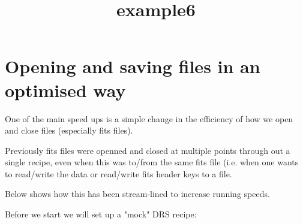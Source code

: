 \documentclass[11pt]{article}
\title{example6}
\begin{document}
    
    
    \maketitle
    
    

    
    \section{Opening and saving files in an optimised
way}\label{opening-and-saving-files-in-an-optimised-way}

One of the main speed ups is a simple change in the efficiency of how we
open and close files (especially fits files).

Previously fits files were openned and closed at multiple points through
out a single recipe, even when this was to/from the same fits file (i.e.
when one wants to read/write the data or read/write fits header keys to
a file.

Below shows how this has been stream-lined to increase running speeds.

Before we start we will set up a "mock" DRS recipe:
\end{document}
